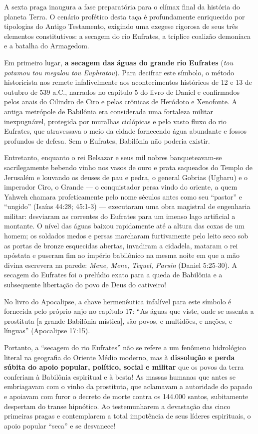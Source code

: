 \documentclass[11pt,a4paper,openany]{book}
\begin{document}
A sexta praga inaugura a fase preparatória para o clímax final da história do planeta Terra. O cenário profético desta taça é profundamente enriquecido por tipologias do Antigo Testamento, exigindo uma exegese rigorosa de seus três elementos constitutivos: a secagem do rio Eufrates, a tríplice coalizão demoníaca e a batalha do Armagedom.

Em primeiro lugar, \textbf{a secagem das águas do grande rio Eufrates} (\textit{tou potamou tou megalou tou Euphratou}).
Para decifrar este símbolo, o método historicista nos remete infalivelmente aos acontecimentos históricos de 12 e 13 de outubro de 539 a.C., narrados no capítulo 5 do livro de Daniel e confirmados pelos anais do Cilindro de Ciro e pelas crônicas de Heródoto e Xenofonte. A antiga metrópole de Babilônia era considerada uma fortaleza militar inexpugnável, protegida por muralhas ciclópicas e pelo vasto fluxo do rio Eufrates, que atravessava o meio da cidade fornecendo água abundante e fossos profundos de defesa. Sem o Eufrates, Babilônia não poderia existir.

Entretanto, enquanto o rei Belsazar e seus mil nobres banqueteavam-se sacrilegamente bebendo vinho nos vasos de ouro e prata saqueados do Templo de Jerusalém e louvando os deuses de pau e pedra, o general Gobrias (Ugbaru) e o imperador Ciro, o Grande — o conquistador persa vindo do oriente, a quem Yahweh chamara profeticamente pelo nome séculos antes como seu ``pastor'' e ``ungido'' (Isaías 44:28; 45:1-3) — executaram uma obra magistral de engenharia militar: desviaram as correntes do Eufrates para um imenso lago artificial a montante. O nível das águas baixou rapidamente até a altura das coxas de um homem; os soldados medos e persas marcharam furtivamente pelo leito seco sob as portas de bronze esquecidas abertas, invadiram a cidadela, mataram o rei apóstata e puseram fim ao império babilônico na mesma noite em que a mão divina escrevera na parede: \textit{Mene, Mene, Tequel, Parsin} (Daniel 5:25-30). A secagem do Eufrates foi o prelúdio exato para a queda de Babilônia e a subsequente libertação do povo de Deus do cativeiro!

No livro do Apocalipse, a chave hermenêutica infalível para este símbolo é fornecida pelo próprio anjo no capítulo 17:
``As águas que viste, onde se assenta a prostituta [a grande Babilônia mística], são povos, e multidões, e nações, e línguas'' (Apocalipse 17:15).

Portanto, a ``secagem do rio Eufrates'' não se refere a um fenômeno hidrológico literal na geografia do Oriente Médio moderno, mas à \textbf{dissolução e perda súbita do apoio popular, político, social e militar} que os povos da terra conferiam à Babilônia espiritual e à besta! As massas humanas que antes se embriagavam com o vinho da prostituta, que aclamavam a autoridade do papado e apoiavam com furor o decreto de morte contra os 144.000 santos, subitamente despertam do transe hipnótico. Ao testemunharem a devastação das cinco primeiras pragas e contemplarem a total impotência de seus líderes espirituais, o apoio popular ``seca'' e se desvanece!
\end{document}

